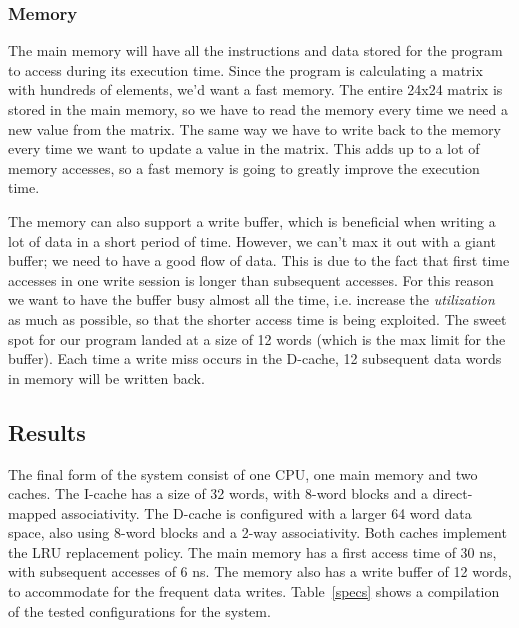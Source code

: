 \documentclass[a4paper,9pt,fleqn]{article}
\begin{document}
\subsubsection{Memory}
The main memory will have all the instructions and data stored for the program to access during its 
execution time. Since the program is calculating a matrix with hundreds of elements, we'd want a fast 
memory. The entire 24x24 matrix is stored in the main memory, so we have to read the memory every 
time we need a new value from the matrix. The same way we have to write back to the memory every 
time we want to update a value in the matrix. This adds up to a lot of memory accesses, so a fast memory 
is going to greatly improve the execution time. 

The memory can also support a write buffer, which is beneficial when writing a lot of data in a short period 
of time. However, we can't max it out with a giant buffer; we need to have a good flow of data. This is due 
to the fact that first time accesses in one write session is longer than subsequent accesses. For this 
reason we want to have the buffer busy almost all the time, i.e. increase the {\it utilization} as much as 
possible, so that the shorter access time is being exploited. The sweet spot for our program landed at a 
size of 12 words (which is the max limit for the buffer). Each time a write miss occurs in the D-cache, 12
subsequent data words in memory will be written back.

\subsection{Results}
The final form of the system consist of one CPU, one main memory and two caches. The I-cache has a
size of 32 words, with 8-word blocks and a direct-mapped associativity. The D-cache is configured with a 
larger 64 word data space, also using 8-word blocks and a 2-way associativity. Both caches 
implement the LRU replacement policy. The main memory has a first access time of 30 ns, with 
subsequent accesses of 6 ns. The memory also has a write buffer of 12 words, to accommodate for the 
frequent data writes. Table~\ref{specs} shows a compilation of the tested configurations
for the system. 
\end{document}
